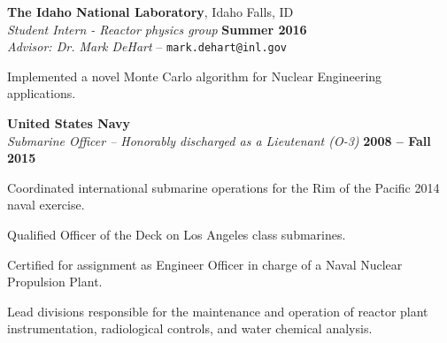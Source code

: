 \documentclass[margin,line]{resume}
\begin{document}
\begin{resume}
\begin{list2}
                \end{list2}

    \textbf{The Idaho National Laboratory}, Idaho Falls, ID \\
                \textsl{Student Intern - Reactor physics group} \hfill
                \textbf{Summer 2016}\\
                \textsl{Advisor: Dr. Mark DeHart} --
                \verb`mark.dehart@inl.gov`
                \begin{list2}
                \item[] Implemented a novel Monte Carlo algorithm for Nuclear
                Engineering applications.
                \end{list2}
    \textbf{United States Navy} \\
    \textsl{Submarine Officer -- Honorably discharged as a Lieutenant (O-3)} \hfill \textbf{2008 -- Fall 2015}
    \\\vspace{-3mm}
    \begin{list2}
    \item Coordinated international submarine operations for the Rim of the Pacific 2014 naval exercise.
    \item Qualified Officer of the Deck on Los Angeles class submarines.
    \item Certified for assignment as Engineer Officer in charge of a Naval Nuclear Propulsion Plant.
    \item Lead divisions responsible for the maintenance and operation of reactor plant instrumentation, radiological controls, and water chemical analysis.
          \end{list2}
                

\end{resume}
\end{document}
